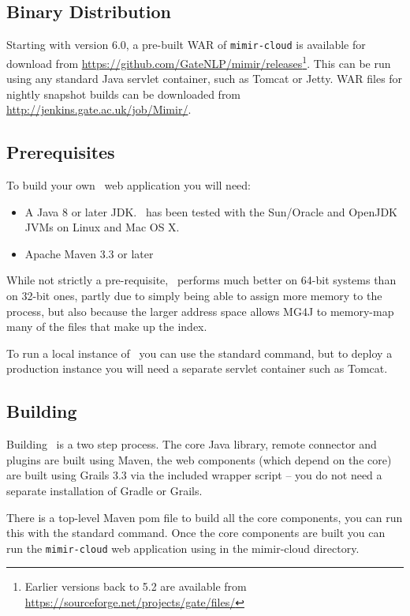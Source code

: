 \subsection{Binary Distribution}

Starting with version 6.0, a pre-built WAR of {\tt mimir-cloud} is available
for download from
\url{https://github.com/GateNLP/mimir/releases}\footnote{Earlier versions back
to 5.2 are available from \url{https://sourceforge.net/projects/gate/files/}}.
This can be run using any standard Java servlet container, such as Tomcat or
Jetty.  WAR files for nightly snapshot builds can be downloaded from
\url{http://jenkins.gate.ac.uk/job/Mimir/}.

\subsection{Prerequisites}

To build your own \Mimir\ web application you will need:
\begin{itemize}
\item A Java 8 or later JDK.  \Mimir\ has been tested with the Sun/Oracle and OpenJDK
  JVMs on Linux and Mac OS X.
\item Apache Maven 3.3 or later
\end{itemize}

While not strictly a pre-requisite, \Mimir\ performs much better on 64-bit
systems than on 32-bit ones, partly due to simply being able to assign more
memory to the process, but also because the larger address space allows MG4J to
memory-map many of the files that make up the index.

To run a local instance of \Mimir\ you can use the standard  command, but to deploy a production instance you will need a
separate servlet container such as Tomcat.

\subsection{Building}

Building \Mimir\ is a two step process.  The core Java library, remote connector
and plugins are built using Maven, the web components (which depend on the core)
are built using Grails 3.3 via the included wrapper script -- you do not need
a separate installation of Gradle or Grails.

There is a top-level Maven pom file to build all the core components, you can
run this with the standard  command.  Once the core components
are built you can run the {\tt mimir-cloud} web application using
 in the mimir-cloud directory.

